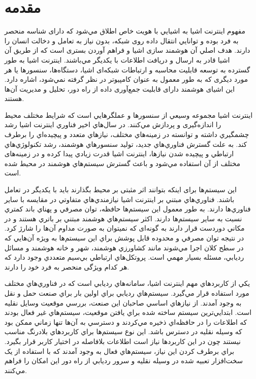 \chapter{مقدمه}
مفهوم اينترنت اشيا  به اشيايي با هويت خاص اطلاق مي‌شود كه دارای شناسه منحصر به فرد بوده و توانايي انتقال داده روی شبکه، بدون نياز به تعامل و دخالت انسان را دارند. هدف اصلي آن هوشمند سازی اشيا و فراهم آوردن بستری است كه از طريق آن اشيا قادر به ارسال و دريافت اطلاعات با يکديگر مي‌باشند. اينترنت اشيا به طور گسترده به توسعه قابليت محاسبه و ارتباطات شبکه‌ای اشيا، دستگاه‌ها، سنسورها يا هر مورد ديگری كه به طور معمول به عنوان كامپيوتر در نظر گرفته نمي‌شود، اشاره دارد. اين اشيای هوشمند دارای قابليت جمع‌آوری داده از راه دور، تحليل و مديريت آن‌ها هستند. \cite{Mukhtar2015}


اینترنت اشیا مجموعه وسيعي از سنسورها و عملگرهايي است كه شرايط مختلف محیط را اندازه‌گیری و پردازش مي‌كنند. در سال‌هاي اخير فناوري اينترنت اشيا رشد چشمگيري داشته و توانسته در زمينه‌هاي مختلف، نيازهاي متعدد و پيچيده‌اي را برطرف كند. به علت گسترش فناوري‌هاي جديد، توليد سنسورهاي هوشمند، رشد تكنولوژي‌هاي ارتباطي و پيچيده شدن نيازها، اينترنت اشيا قدرت زيادي پيدا كرده و در زمینه‌های مختلف از آن استفاده مي‌شود و باعث گسترش سيستم‌هاي هوشمند در محیط شده است. \cite{Shah2016}


 این سیستم‌ها برای اینکه بتوانند اثر مثبتی بر محیط بگذارند باید با یکدیگر در تعامل باشند. فناوري‌هاي مبتني بر اينترنت اشيا نيازمندي‌هاي متفاوتي در مقايسه با ساير فناوري‌ها دارند. به طور معمول اين سيستم‌ها حافظه، توان مصرفي و پهناي باند كمتري نسبت به ساير سيستم‌ها دارند. اكثر سيستم‌هاي هوشمند مبتني بر باتري هستند و در مكاني دوردست قرار دارند به گونه‌ای كه نمیتوان به صورت مداوم آن‌ها را شارژ كرد. در نتيجه توان مصرفي و محدوده قابل پوشش براي اين سيستم‌ها به ويژه آن‌هايي كه در سطح كلان اجرا مي‌شوند مانند كشاورزي هوشمند، شهر و خانه هوشمند و مسائل رديابي، مسئله بسيار مهمي است. پروتكل‌هاي ارتباطي بي‌سيم متعددي وجود دارد كه هر كدام ويژگی منحصر به فرد خود را دارند.

يكي از كاربردهاي مهم اينترنت اشيا، سامانه‌هاي رديابي است كه در فناوري‌هاي مختلف مورد استفاده قرار مي‌گیرد. سيستم‌هاي رديابي براي اولين بار براي صنعت حمل و نقل به وجود آمدند. از نيازهاي اساسي صاحبان اين صنعت، بررسي موقعيت وسايل نقليه است. ابتدايي‌ترين سيستم‌ ساخته شده براي يافتن موقعيت، سيستم‌هاي غير فعال بودند كه اطلاعات را در حافظه‌اي ذخیره مي‌كردند و دسترسي به آن‌ها تنها زماني ممكن بود كه وسيله نقليه در دسترس باشد. اين نوع سيستم‌ها براي كاربردهاي بلادرنگ مناسب نيستند چون در اين كاربردها نياز است اطلاعات بلافاصله در اختيار كاربر قرار بگيرد. براي برطرف كردن اين نياز، سيستم‌هاي فعال به وجود آمدند كه با استفاده از يک سخت‌افزار تعبيه شده در وسيله نقليه و سرور رديابي از راه دور اين امكان را فراهم مي‌كنند.
\\


